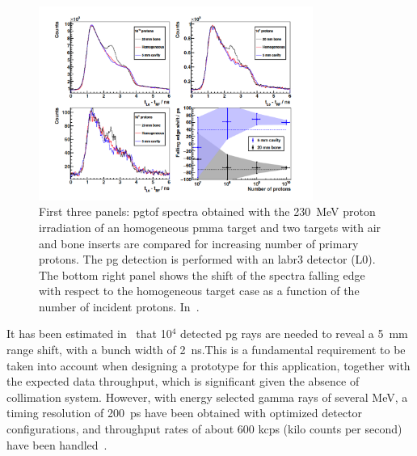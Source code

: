 \begin{figure}[!htbp]
\centering
\includegraphics[width=0.8\textwidth]{03_GraphicFiles/chapter2_GammaCameras/PGT_stats.pdf}
\caption{First three panels: \gls{pg}\gls{tof} spectra obtained with the 230~MeV proton irradiation of an homogeneous \gls{pmma} target and two targets with air and bone inserts are compared for increasing number of primary protons. The \gls{pg} detection is performed with an \gls{labr3} detector (L0). The bottom right panel shows the shift of the spectra falling edge with respect to the homogeneous target case as a function of the number of incident protons. In~\cite{HuesoGonzalez2015b}.}
\label{chap2::fig::PGT_stats}
\end{figure}  

It has been estimated in~\cite{Pausch2016} that 10$^4$ detected \gls{pg} rays are needed to reveal a 5~mm range shift, with a bunch width of 2~ns.This is a fundamental requirement to be taken into account when designing a prototype for this application, together with the expected data throughput, which is significant given the absence of collimation system. However, with energy selected gamma rays of several MeV, a timing resolution of 200~ps have been obtained with optimized detector configurations, and throughput rates of about 600 kcps (kilo counts per second) have been handled~\cite{Pausch2016}. 

